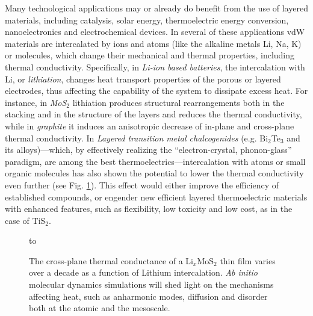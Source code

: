 Many technological applications may or already do benefit from the use of layered materials, including catalysis, solar energy, thermoelectric energy conversion, nanoelectronics and electrochemical devices. In several of these applications vdW materials are intercalated by ions and atoms (like the alkaline metals Li, Na, K) or molecules, which change their mechanical and thermal properties, including thermal conductivity. Specifically, in \textit{Li-ion based batteries}, the intercalation with Li, or \textit{lithiation}, changes heat transport properties of the porous or layered electrodes, thus affecting the capability of the system to dissipate excess heat. For instance, in \textit{MoS$_2$} lithiation produces structural rearrangements both in the stacking and in the structure of the layers and reduces the thermal conductivity,\cite{Zhu:2016gl} while in \textit{graphite} it induces an anisotropic decrease of in-plane and cross-plane thermal conductivity.\cite{Qian:2016hw} In \textit{Layered transition metal chalcogenides} (e.g. Bi$_2$Te$_3$ and its alloys\cite{Yan:2010ee})---which, by effectively realizing the ``electron-crystal, phonon-glass'' paradigm,\cite{Nolas:1999kv} are among the best thermoelectrics---intercalation with atoms or small organic molecules has also shown the potential to lower the thermal conductivity even further (see Fig. \ref{fig:LiMoS2}). This effect would either improve the efficiency of established compounds, or engender new efficient layered thermoelectric materials with enhanced features, such as flexibility, low toxicity and low cost, as in the case of TiS$_2$.\cite{Wan:2015hd} 

\begin{figure}
\hbox to 
\vspace*{-5mm}
\caption{The cross-plane thermal conductance of a Li$_x$MoS$_2$ thin film varies over a decade as a function of Lithium intercalation.\cite{Sood2017} {\sl Ab initio} molecular dynamics simulations will shed light on the mechanisms affecting heat, such as anharmonic modes, diffusion and disorder both at the atomic and the mesoscale.}
\label{fig:LiMoS2}
\end{figure}

